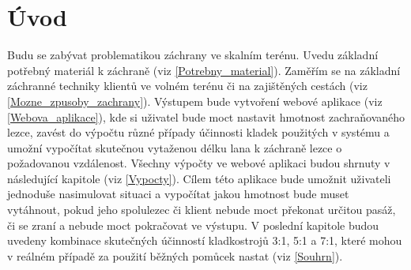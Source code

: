 \chapter*{Úvod}
\label{Uvod}
\def\figurename{Obr.} %
\def\tablename{Tab.} %
\def\figureautorefname{obr.} %
\def\tableautorefname{tab.} %
\def\chapterautorefname{kapitola} %
Budu se zabývat problematikou záchrany ve skalním terénu. Uvedu základní potřebný materiál k záchraně (viz \autoref{Potrebny_material}). Zaměřím se na základní záchranné techniky klientů ve volném terénu či na zajištěných cestách (viz \autoref{Mozne_zpusoby_zachrany}). Výstupem bude vytvoření webové aplikace (viz \autoref{Webova_aplikace}), kde si uživatel bude moct nastavit hmotnost zachraňovaného lezce, zavést do výpočtu různé případy účinnosti kladek použitých v systému a umožní vypočítat skutečnou vytaženou délku lana k záchraně lezce o požadovanou vzdálenost. Všechny výpočty ve webové aplikaci budou shrnuty v následující kapitole (viz \autoref{Vypocty}). Cílem této aplikace bude umožnit uživateli jednoduše nasimulovat situaci a vypočítat jakou hmotnost bude muset vytáhnout, pokud jeho spolulezec či klient nebude moct překonat určitou pasáž, či se zraní a nebude moct pokračovat ve výstupu. V poslední kapitole budou uvedeny kombinace skutečných účinností kladkostrojů 3:1, 5:1 a 7:1, které mohou v reálném případě za použití běžných pomůcek nastat (viz \autoref{Souhrn}).